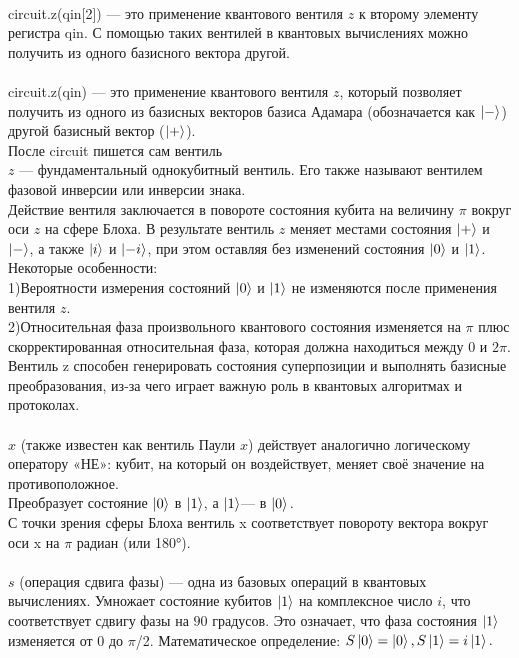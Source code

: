 \documentclass[12pt,a4paper]{article}
\begin{document}
		\hspace{1em}\\
	
		circuit.z(qin[2]) — это применение квантового вентиля $z$ к второму элементу регистра qin.  С помощью таких вентилей в квантовых вычислениях можно получить из одного базисного вектора другой.\\
		\hspace{1em}\\
		circuit.z(qin) — это применение квантового вентиля $z$, который позволяет получить из одного из базисных векторов базиса Адамара (обозначается как $\ket{-}$) другой базисный вектор ($\ket{+}$).\\
		
		После circuit пишется сам вентиль\\
		$z$ — фундаментальный однокубитный вентиль. Его также называют вентилем фазовой инверсии или инверсии знака.\\
		Действие вентиля заключается в повороте состояния кубита на величину $\pi$ вокруг оси $z$ на сфере Блоха. В результате вентиль $z$ меняет местами состояния $\ket{+}$ и $\ket{-}$, а также $\ket{i}$ и $\ket{-i}$, при этом оставляя без изменений состояния  $\ket{0}$ и $\ket{1}$.
		Некоторые особенности:\\
		1)Вероятности измерения состояний $\ket{0}$ и $\ket{1}$ не изменяются после применения вентиля $z$.\\
		2)Относительная фаза произвольного квантового состояния изменяется на $\pi$ плюс скорректированная относительная фаза, которая должна находиться между $0$ и $2\pi$.
		Вентиль z способен генерировать состояния суперпозиции и выполнять базисные преобразования, из-за чего играет важную роль в квантовых алгоритмах и протоколах.\\
	
		\hspace{1em}\\
		$x$ (также известен как вентиль Паули $x$) действует аналогично логическому оператору «НЕ»: кубит, на который он воздействует, меняет своё значение на противоположное.\\
		Преобразует состояние $\ket{0}$ в $\ket{1}$, а $\ket{1}$— в $\ket{0}.$\\
		С точки зрения сферы Блоха вентиль x соответствует повороту вектора вокруг оси x на $\pi$ радиан (или 180°).\\
	
		\hspace{1em}\\
		$s$ (операция сдвига фазы) — одна из базовых операций в квантовых вычислениях.
		Умножает состояние кубитов $\ket{1}$ на комплексное число $i$, что соответствует сдвигу фазы на $90$ градусов. Это означает, что фаза состояния $\ket{1}$ изменяется от 0 до $\pi$/2.
		Математическое определение: $S \ket{0} = \ket{0}, S \ket{1} = i \ket{1}.$\\
		
\end{document}
